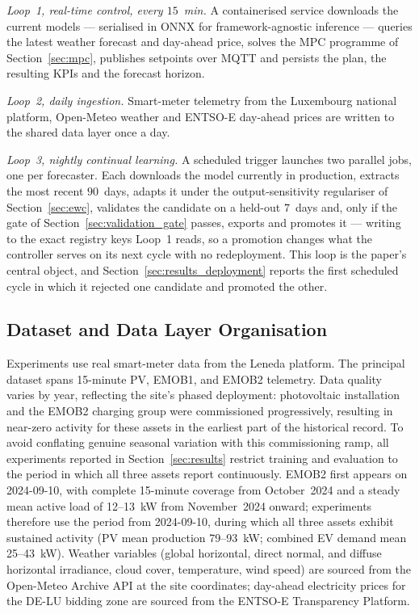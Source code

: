 \documentclass[journal]{IEEEtran}
\begin{document}
\emph{Loop~1, real-time control, every $15$~min.} A containerised service
downloads the current models --- serialised in ONNX for framework-agnostic
inference --- queries the latest weather forecast and day-ahead price, solves
the MPC programme of Section~\ref{sec:mpc}, publishes setpoints over MQTT and
persists the plan, the resulting KPIs and the forecast horizon.

\emph{Loop~2, daily ingestion.} Smart-meter telemetry from the Luxembourg
national platform, Open-Meteo weather and ENTSO-E day-ahead prices are written
to the shared data layer once a day.

\emph{Loop~3, nightly continual learning.} A scheduled trigger launches two
parallel jobs, one per forecaster. Each downloads the model currently in
production, extracts the most recent $90$~days, adapts it under the
output-sensitivity regulariser of Section~\ref{sec:ewc}, validates the
candidate on a held-out $7$~days and, only if the gate of
Section~\ref{sec:validation_gate} passes, exports and promotes it --- writing to
the exact registry keys Loop~1 reads, so a promotion changes what the controller
serves on its next cycle with no redeployment. This loop is the paper's central
object, and Section~\ref{sec:results_deployment} reports the first scheduled
cycle in which it rejected one candidate and promoted the other.

\subsection{Dataset and Data Layer Organisation}
\label{sec:dataset}

Experiments use real smart-meter data from the Leneda platform. The
principal dataset spans 15-minute PV, EMOB1, and EMOB2 telemetry.
Data quality varies by year, reflecting the site's phased deployment:
photovoltaic installation and the EMOB2 charging group were
commissioned progressively, resulting in near-zero activity for these
assets in the earliest part of the historical record. To avoid
conflating genuine seasonal variation with this commissioning ramp,
all experiments reported in Section~\ref{sec:results} restrict training
and evaluation to the period in which all three assets report
continuously. EMOB2 first appears on 2024-09-10, with complete 15-minute
coverage from October~2024 and a steady mean active load of 12--13~kW from
November~2024 onward; experiments therefore use the period from
2024-09-10, during which all
three assets exhibit sustained activity (PV mean production 79--93~kW;
combined EV demand mean 25--43~kW). Weather variables (global
horizontal, direct normal, and diffuse horizontal irradiance, cloud
cover, temperature, wind speed) are sourced from the Open-Meteo Archive
API at the site coordinates; day-ahead electricity prices for the
DE-LU bidding zone are sourced from the ENTSO-E Transparency Platform.
\end{document}
